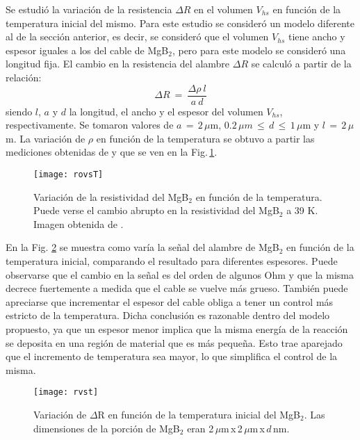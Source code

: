 Se estudió la variación de la resistencia $\Delta R$ en el volumen $V_{hs}$ en función de la temperatura inicial del mismo. Para este estudio se consideró un modelo diferente al de la sección anterior, es decir, se consideró que el volumen $V_{hs}$ tiene ancho y espesor iguales a los del cable de MgB$_2$, pero para este modelo se consideró una longitud fija. El cambio en la resistencia del alambre $\Delta R$ se calculó a partir de la relación\cite{Sears1964}:
\begin{equation}
  \Delta R \ = \ \frac{\Delta \rho \ l}{a \ d}
  \label{eq:DR}
\end{equation}
\noindent
siendo $l$, $a$ y $d$ la longitud, el ancho y el espesor del volumen $V_{hs}$, respectivamente. Se tomaron valores de $a \, = \, 2\,\mu$m, $0.2\, \mu m \, \leq \, d \, \leq \, 1\,\mu$m y $l \, = \, 2\,\mu$m. La variación de $\rho$ en función de la temperatura se obtuvo a partir las mediciones obtenidas de \cite{Nagamatsu2001} y que se ven en la Fig.\,\ref{fig:rovsT}.
\begin{figure}[tbh!]
 \begin{center}
    \texttt{[image: rovsT]}
  \end{center}
  \caption[Variación de la resistividad del MgB$_2$ en función de la temperatura.]{Variación de la resistividad del MgB$_2$ en función de la temperatura. Puede verse el cambio abrupto en la resistividad del MgB$_2$ a 39 K. Imagen obtenida de \cite{Nagamatsu2001}.}
\label{fig:rovsT}
\end{figure}

En la Fig. \ref{fig:rvsT} se muestra como varía la señal del alambre de MgB$_{2}$ en función de la temperatura inicial, comparando el resultado para diferentes espesores. Puede observarse que el cambio en la señal es del orden de algunos Ohm y que la misma decrece fuertemente a medida que el cable se vuelve más grueso. También puede apreciarse que incrementar el espesor del cable obliga a tener un control más estricto de la temperatura. Dicha conclusión es razonable dentro del modelo propuesto, ya que un espesor menor implica que la misma energía de la reacción se deposita en una región de material que es más pequeña. Esto trae aparejado que el incremento de temperatura sea mayor, lo que simplifica el control de la misma.
\begin{figure}[tbh!]
 \begin{center}
    \texttt{[image: rvst]}
  \end{center}
  \caption[Variación de $\Delta$R en función de la temperatura inicial del MgB$_2$.]{Variación de $\Delta$R en función de la temperatura inicial del MgB$_2$. Las dimensiones de la porción de MgB$_2$ eran  2\,$\mu$m\,x\,2\,$\mu$m\,x\,$d$\,nm.}
\label{fig:rvsT}
\end{figure}


